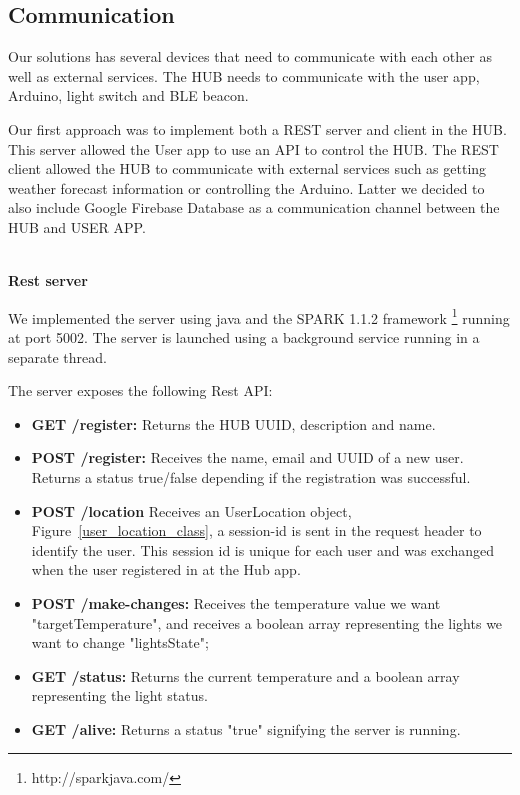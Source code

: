 \subsection{Communication}

Our solutions has several devices that need to communicate with each other as well as external services.
The HUB needs to communicate with the user app, Arduino, light switch and \ac{BLE} beacon. 

Our first approach was to implement both a \ac{REST} server and client in the HUB. This server allowed the User app to use an \ac{API} to control the HUB. The \ac{REST} client allowed the HUB to communicate with external services such as getting weather forecast information or controlling the Arduino.
Latter we decided to also include Google Firebase Database as a communication channel between the HUB and USER APP.


\mbox{}\\
\textbf{Rest server}

We implemented the server using java and the SPARK 1.1.2 framework \footnote{http://sparkjava.com/} running at port 5002. The server is launched using a background service running in a separate thread.

The server exposes the following Rest API: 

\begin{itemize}
  \item \textbf{GET /register:} Returns the HUB UUID, description and name.
  \item \textbf{POST /register:} Receives the name, email and UUID of a new user. Returns a status true/false depending if the registration was successful.
  \item \textbf{POST /location} Receives an UserLocation object, Figure~\ref{user_location_class}, a session-id is sent in the request header to identify the user. This session id is unique for each user and was exchanged when the user registered in at the Hub app.
  \item \textbf{POST /make-changes:} Receives the temperature value we want "targetTemperature", and receives a boolean array representing the lights we want to change "lightsState";
   \item \textbf{GET /status:} Returns the current temperature and a boolean array representing the light status.
   \item \textbf{GET /alive:} Returns a status "true" signifying the server is running.
\end{itemize}


